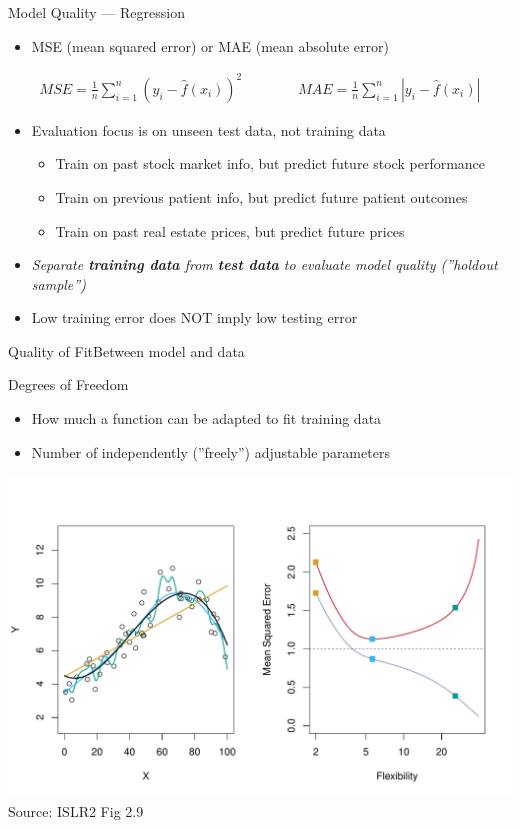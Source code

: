 \documentclass[ignorenonframetext,xcolor=x11names]{beamer}
\begin{document}
\begin{frame}{Model Quality --- Regression}
\begin{itemize}
   \item MSE (mean squared error) or MAE (mean absolute error)
\end{itemize}
\begin{align*}
MSE = \frac{1}{n}\sum_{i=1}^n (y_i - \hat{f}(x_i))^2 \qquad \qquad
MAE = \frac{1}{n}\sum_{i=1}^n |y_i - \hat{f}(x_i)|
\end{align*}
\begin{itemize}
   \item Evaluation focus is on unseen test data, not training data
   \begin{itemize}
      \item Train on past stock market info, but predict future stock performance
      \item Train on previous patient info, but predict future patient outcomes
      \item Train on past real estate prices, but predict future prices
   \end{itemize}
   \item \emph{Separate \textbf{training data} from \textbf{test data} to evaluate model quality (''holdout sample'')}
   \item Low training error does NOT imply low testing error
\end{itemize}
\end{frame}

\begin{frame}{Quality of Fit}{Between model and data}
\begin{block}{Degrees of Freedom}
\begin{itemize} 
  \item How much a function can be adapted to fit training data
  \item Number of independently (''freely'') adjustable parameters
\end{itemize}
\end{block}

\centering
\includegraphics[width=.9\textwidth]{Figures_Chapters_1-6/Chapter2/2_9.pdf} \\

\scriptsize Source: ISLR2 Fig 2.9
\end{frame}
\end{document}
